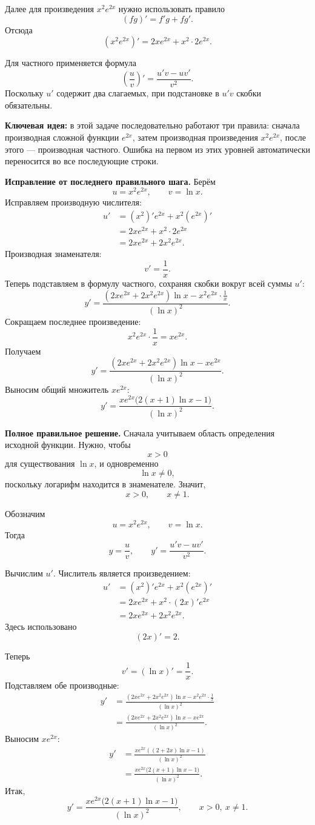 \documentclass[12pt,a4paper]{article}
\begin{document}
Далее для произведения $x^2e^{2x}$ нужно использовать правило
\[
(fg)'=f'g+fg'.
\]
Отсюда
\[
(x^2e^{2x})'=2xe^{2x}+x^2\cdot2e^{2x}.
\]

Для частного применяется формула
\[
\left(\frac{u}{v}\right)'=\frac{u'v-uv'}{v^2}.
\]
Поскольку $u'$ содержит два слагаемых, при подстановке в $u'v$ скобки обязательны.

\textcolor{blue!60!black}{\textbf{Ключевая идея:}}
в этой задаче последовательно работают три правила: сначала производная сложной функции $e^{2x}$, затем производная произведения $x^2e^{2x}$, после этого --- производная частного. Ошибка на первом из этих уровней автоматически переносится во все последующие строки.

\textbf{Исправление от последнего правильного шага.}
Берём
\[
u=x^2e^{2x},\qquad v=\ln x.
\]
Исправляем производную числителя:
\[
\begin{aligned}
u'
&=(x^2)'e^{2x}+x^2(e^{2x})'\\
&=2xe^{2x}+x^2\cdot2e^{2x}\\
&=2xe^{2x}+2x^2e^{2x}.
\end{aligned}
\]
Производная знаменателя:
\[
v'=\frac1x.
\]
Теперь подставляем в формулу частного, сохраняя скобки вокруг всей суммы $u'$:
\[
y'=\frac{(2xe^{2x}+2x^2e^{2x})\ln x-x^2e^{2x}\cdot\frac1x}{(\ln x)^2}.
\]
Сокращаем последнее произведение:
\[
x^2e^{2x}\cdot\frac1x=xe^{2x}.
\]
Получаем
\[
y'=\frac{(2xe^{2x}+2x^2e^{2x})\ln x-xe^{2x}}{(\ln x)^2}.
\]
Выносим общий множитель $xe^{2x}$:
\[
\boxed{y'=\frac{xe^{2x}\bigl(2(x+1)\ln x-1\bigr)}{(\ln x)^2}}.
\]

\textbf{Полное правильное решение.}
Сначала учитываем область определения исходной функции. Нужно, чтобы
\[
x>0
\]
для существования $\ln x$, и одновременно
\[
\ln x\ne0,
\]
поскольку логарифм находится в знаменателе. Значит,
\[
x>0,\qquad x\ne1.
\]

Обозначим
\[
u=x^2e^{2x},\qquad v=\ln x.
\]
Тогда
\[
y=\frac{u}{v},
\qquad
 y'=\frac{u'v-uv'}{v^2}.
\]

Вычислим $u'$. Числитель является произведением:
\[
\begin{aligned}
u'
&=(x^2)'e^{2x}+x^2(e^{2x})'\\
&=2xe^{2x}+x^2\cdot(2x)'e^{2x}\\
&=2xe^{2x}+2x^2e^{2x}.
\end{aligned}
\]
Здесь использовано
\[
(2x)'=2.
\]

Теперь
\[
v'=(\ln x)'=\frac1x.
\]
Подставляем обе производные:
\[
\begin{aligned}
y'
&=\frac{(2xe^{2x}+2x^2e^{2x})\ln x-x^2e^{2x}\cdot\frac1x}{(\ln x)^2}\\
&=\frac{(2xe^{2x}+2x^2e^{2x})\ln x-xe^{2x}}{(\ln x)^2}.
\end{aligned}
\]
Выносим $xe^{2x}$:
\[
\begin{aligned}
y'
&=\frac{xe^{2x}\left((2+2x)\ln x-1\right)}{(\ln x)^2}\\
&=\frac{xe^{2x}\bigl(2(x+1)\ln x-1\bigr)}{(\ln x)^2}.
\end{aligned}
\]
Итак,
\[
\boxed{y'=\frac{xe^{2x}\bigl(2(x+1)\ln x-1\bigr)}{(\ln x)^2}},
\qquad x>0,\ x\ne1.
\]
\end{document}
